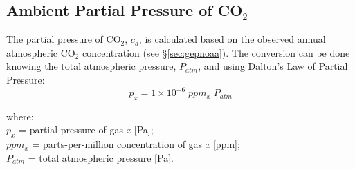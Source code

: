 \subsection{Ambient Partial Pressure of CO$_2$}
\label{sec:ca}
The partial pressure of CO$_2$, $c_a$, is calculated based on the observed annual atmospheric CO$_2$ concentration (see \S \ref{sec:gepnoaa}). 
The conversion can be done knowing the total atmospheric pressure, $P_{atm}$, and using Dalton's Law of Partial Pressure:
\begin{equation}
\label{eq:pp}
    p_x = 1\times 10^{-6}\; ppm_x\; P_{atm}
\end{equation}

\noindent where:\\
\indent $p_x$ = partial pressure of gas \textit{x} [Pa];\\
\indent $ppm_x$ = parts-per-million concentration of gas \textit{x} [ppm];\\
\indent $P_{atm}$ = total atmospheric pressure [Pa].\\

